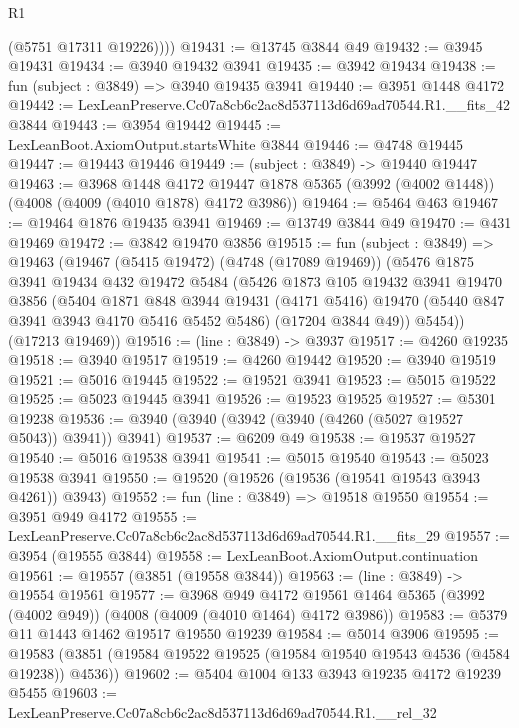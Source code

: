 \begin{lexlean}{R1}
\begin{coremodule}
          (@5751 @17311 @19226))))
@19431 := @13745 @3844 @49
@19432 := @3945 @19431
@19434 := @3940 @19432 @3941
@19435 := @3942 @19434
@19438 := fun (subject : @3849) => @3940 @19435 @3941
@19440 := @3951 @1448 @4172
@19442 := LexLeanPreserve.Cc07a8cb6c2ac8d537113d6d69ad70544.R1.__fits_42 @3844
@19443 := @3954 @19442
@19445 := LexLeanBoot.AxiomOutput.startsWhite @3844
@19446 := @4748 @19445
@19447 := @19443 @19446
@19449 := (subject : @3849) -> @19440 @19447
@19463 := @3968
    @1448
    @4172
    @19447
    @1878
    @5365
    (@3992 (@4002 @1448))
    (@4008 (@4009 (@4010 @1878) @4172 @3986))
@19464 := @5464 @463
@19467 := @19464 @1876 @19435 @3941
@19469 := @13749 @3844 @49
@19470 := @431 @19469
@19472 := @3842 @19470 @3856
@19515 := fun (subject : @3849) =>
  @19463
    (@19467
      (@5415 @19472)
      (@4748 (@17089 @19469))
      (@5476
        @1875
        @3941
        @19434
        @432
        @19472
        @5484
        (@5426
          @1873
          @105
          @19432
          @3941
          @19470
          @3856
          (@5404
            @1871
            @848
            @3944
            @19431
            (@4171 @5416)
            @19470
            (@5440 @847 @3941 @3943 @4170 @5416 @5452 @5486)
            (@17204 @3844 @49))
          @5454))
      (@17213 @19469))
@19516 := (line : @3849) -> @3937
@19517 := @4260 @19235
@19518 := @3940 @19517
@19519 := @4260 @19442
@19520 := @3940 @19519
@19521 := @5016 @19445
@19522 := @19521 @3941
@19523 := @5015 @19522
@19525 := @5023 @19445 @3941
@19526 := @19523 @19525
@19527 := @5301 @19238
@19536 := @3940 (@3940 (@3942 (@3940 (@4260 (@5027 @19527 @5043)) @3941)) @3941)
@19537 := @6209 @49
@19538 := @19537 @19527
@19540 := @5016 @19538 @3941
@19541 := @5015 @19540
@19543 := @5023 @19538 @3941
@19550 := @19520 (@19526 (@19536 (@19541 @19543 @3943 @4261)) @3943)
@19552 := fun (line : @3849) => @19518 @19550
@19554 := @3951 @949 @4172
@19555 := LexLeanPreserve.Cc07a8cb6c2ac8d537113d6d69ad70544.R1.__fits_29
@19557 := @3954 (@19555 @3844)
@19558 := LexLeanBoot.AxiomOutput.continuation
@19561 := @19557 (@3851 (@19558 @3844))
@19563 := (line : @3849) -> @19554 @19561
@19577 := @3968
    @949
    @4172
    @19561
    @1464
    @5365
    (@3992 (@4002 @949))
    (@4008 (@4009 (@4010 @1464) @4172 @3986))
@19583 := @5379 @11 @1443 @1462 @19517 @19550 @19239
@19584 := @5014 @3906
@19595 := @19583 (@3851 (@19584 @19522 @19525 (@19584 @19540 @19543 @4536 (@4584 @19238)) @4536))
@19602 := @5404 @1004 @133 @3943 @19235 @4172 @19239 @5455
@19603 := LexLeanPreserve.Cc07a8cb6c2ac8d537113d6d69ad70544.R1.__rel_32

\end{coremodule}
\end{lexlean}

